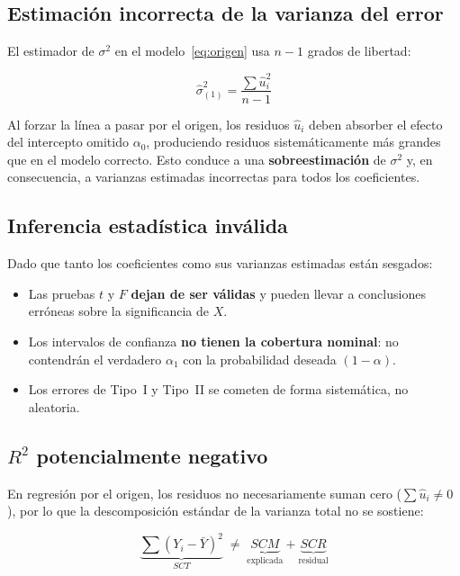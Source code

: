 \documentclass[12pt, letterpaper]{article}
\begin{document}
\subsection{Estimación incorrecta de la varianza del error}

El estimador de $\sigma^2$ en el modelo~\eqref{eq:origen} usa $n - 1$
grados de libertad:

\begin{equation}
  \hat{\sigma}^2_{(1)} = \frac{\sum \hat{u}_i^2}{n - 1}
\end{equation}

Al forzar la línea a pasar por el origen, los residuos $\hat{u}_i$ deben
absorber el efecto del intercepto omitido $\alpha_0$, produciendo residuos
sistemáticamente más grandes que en el modelo correcto. Esto conduce a una
\textbf{sobreestimación} de $\sigma^2$ y, en consecuencia, a varianzas
estimadas incorrectas para todos los coeficientes.

\subsection{Inferencia estadística inválida}

Dado que tanto los coeficientes como sus varianzas estimadas están sesgados:

\begin{itemize}[leftmargin=1.8em]
  \item Las pruebas $t$ y $F$ \textbf{dejan de ser válidas} y pueden llevar
    a conclusiones erróneas sobre la significancia de $X$.
  \item Los intervalos de confianza \textbf{no tienen la cobertura nominal}:
    no contendrán el verdadero $\alpha_1$ con la probabilidad deseada $(1-\alpha)$.
  \item Los errores de Tipo~I y Tipo~II se cometen de forma sistemática,
    no aleatoria.
\end{itemize}

\subsection{$R^2$ potencialmente negativo}

En regresión por el origen, los residuos no necesariamente suman cero
($\sum \hat{u}_i \neq 0$), por lo que la descomposición estándar de la
varianza total no se sostiene:

\begin{equation}
  \underbrace{\sum(Y_i - \bar{Y})^2}_{SCT}
  \;\neq\;
  \underbrace{SCM}_{\text{explicada}}
  +
  \underbrace{SCR}_{\text{residual}}
\end{equation}
\end{document}
